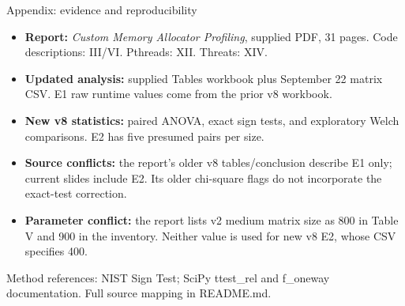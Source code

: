 \documentclass[aspectratio=169,11pt]{beamer}
\newcommand{\source}[1]{\par\vfill{\tiny\color{gray}#1\par}}
\begin{document}
\begin{frame}{Appendix: evidence and reproducibility}
\small
\begin{itemize}
\item \textbf{Report:} \emph{Custom Memory Allocator Profiling}, supplied PDF, 31 pages. Code descriptions: III/VI. Pthreads: XII. Threats: XIV.
\item \textbf{Updated analysis:} supplied Tables workbook plus September 22 matrix CSV. E1 raw runtime values come from the prior v8 workbook.
\item \textbf{New v8 statistics:} paired ANOVA, exact sign tests, and exploratory Welch comparisons. E2 has five presumed pairs per size.
\item \textbf{Source conflicts:} the report’s older v8 tables/conclusion describe E1 only; current slides include E2. Its older chi-square flags do not incorporate the exact-test correction.
\item \textbf{Parameter conflict:} the report lists v2 medium matrix size as 800 in Table V and 900 in the inventory. Neither value is used for new v8 E2, whose CSV specifies 400.
\end{itemize}
\source{Method references: NIST Sign Test; SciPy ttest\_rel and f\_oneway documentation. Full source mapping in README.md.}
\end{frame}
\end{document}
